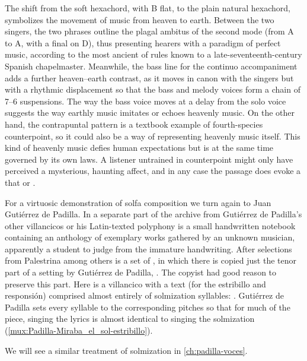 The shift from the  soft hexachord, with B flat, to the plain
natural hexachord, symbolizes the movement of music from heaven to earth.
Between the two singers, the two phrases outline the plagal ambitus of the
second mode (from A to A, with a final on D), thus presenting hearers with a
paradigm of perfect music, according to the most ancient of rules known to a
late-seventeenth-century Spanish chapelmaster.
Meanwhile, the bass line for the continuo accompaniment adds a further
heaven--earth contrast, as it moves in canon with the singers but with a
rhythmic displacement so that the bass and melody voices form a chain of 7--6
suspensions.
The way the bass voice moves at a delay from the solo voice suggests the way
earthly music imitates or echoes heavenly music.
On the other hand, the contrapuntal pattern is a textbook example of
fourth-species counterpoint, so it could also be a way of representing heavenly
music itself.  
This kind of heavenly music defies human expectations but is at the same time
governed by its own laws.
A listener untrained in counterpoint might only have perceived a mysterious,
haunting affect, and in any case the passage does evoke a  that  or .

For a virtuosic demonstration of solfa composition we turn again to Juan
Gutiérrez de Padilla.
In a separate part of the archive from Gutiérrez de Padilla's other villancicos
or his Latin-texted polyphony is a small handwritten notebook containing an
anthology of exemplary works gathered by an unknown musician, apparently a
student to judge from the immature handwriting.
After selections from Palestrina among others is a set of , in which there is copied just the tenor part of a setting
by Gutiérrez de Padilla, .
The copyist had good reason to preserve this part.
Here is a villancico with a text (for the estribillo and responsión) comprised
almost entirely of solmization syllables: .
Gutiérrez de Padilla sets every syllable to the corresponding pitches so that
for much of the piece, singing the lyrics is almost identical to singing the
solmization (\cref{mux:Padilla-Miraba_el_sol-estribillo}).%
\begin{Footnote}
    We will see a similar treatment of solmization in \cref{ch:padilla-voces}.
\end{Footnote}

